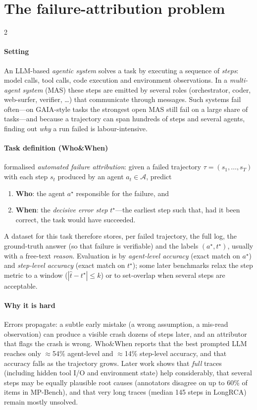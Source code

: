 \section{The failure-attribution problem}\label{sec:intro}

\begin{multicols}{2}
\paragraph{Setting} An LLM-based \emph{agentic system} solves a task by executing a sequence of \emph{steps}: model calls, tool calls, code execution and environment observations. In a \emph{multi-agent system} (MAS) these steps are emitted by several roles (orchestrator, coder, web-surfer, verifier, \dots) that communicate through messages. Such systems fail often---on GAIA-style tasks the strongest open MAS still fail on a large share of tasks---and because a trajectory can span hundreds of steps and several agents, finding out \emph{why} a run failed is labour-intensive.

\paragraph{Task definition (Who\&When)} \citet{zhang2025who} formalised \emph{automated failure attribution}: given a failed trajectory $\tau=(s_1,\dots,s_T)$ with each step $s_t$ produced by an agent $a_t\in\mathcal{A}$, predict
\begin{enumerate}
\item \textbf{Who}: the agent $a^\star$ responsible for the failure, and
\item \textbf{When}: the \emph{decisive error step} $t^\star$---the earliest step such that, had it been correct, the task would have succeeded.
\end{enumerate}
A dataset for this task therefore stores, per failed trajectory, the full log, the ground-truth answer (so that failure is verifiable) and the labels $(a^\star,t^\star)$, usually with a free-text \emph{reason}. Evaluation is by \emph{agent-level accuracy} (exact match on $a^\star$) and \emph{step-level accuracy} (exact match on $t^\star$); some later benchmarks relax the step metric to a window ($|{\hat t}-t^\star|\le k$) or to set-overlap when several steps are acceptable.

\paragraph{Why it is hard} Errors propagate: a subtle early mistake (a wrong assumption, a mis-read observation) can produce a visible crash dozens of steps later, and an attributor that flags the crash is wrong. Who\&When reports that the best prompted LLM reaches only $\approx$54\% agent-level and $\approx$14\% step-level accuracy, and that accuracy falls as the trajectory grows. Later work shows that \emph{full} traces (including hidden tool I/O and environment state) help considerably, that several steps may be equally plausible root causes (annotators disagree on up to 60\% of items in MP-Bench), and that very long traces (median 145 steps in LongRCA) remain mostly unsolved.


\end{multicols}
